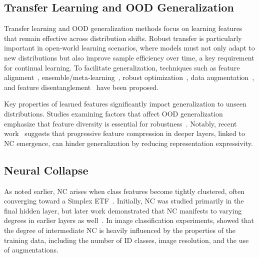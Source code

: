 \subsection{Transfer Learning and OOD Generalization}
\vspace{-0.5em}

Transfer learning and OOD generalization methods focus on learning features that remain effective across distribution shifts. Robust transfer is particularly important in open-world learning scenarios, where models must not only adapt to new distributions but also improve sample efficiency over time, a key requirement for continual learning. To facilitate generalization, techniques such as feature alignment~\cite{li2018domain, ahuja2021invariance, zhao2020domain, ming2024hypo}, ensemble/meta-learning~\cite{balaji2018metareg, li2018metalearning, li2019episodic, bui2021exploiting}, robust optimization~\cite{rame2022fishr, cha2021swad, krueger2021out, shi2021gradient}, data augmentation~\cite{nam2021reducing, nuriel2021permuted, zhou2020learning}, and feature disentanglement~\cite{zhang2022towards} have been proposed.

Key properties of learned features significantly impact generalization to unseen distributions. Studies examining factors that affect OOD generalization emphasize that feature diversity is essential for robustness~\cite{masarczyk2023tunnel, kornblith2021better, fang2024does, ramanujan2024connection, kolesnikov2020big, vishniakov2024convnet}. Notably, recent work~\cite{kothapalli2023neural, masarczyk2023tunnel, harun2024what} suggests that progressive feature compression in deeper layers, linked to NC emergence, can hinder generalization by reducing representation expressivity. %

\subsection{Neural Collapse}
\label{sec:nc_background}
\vspace{-0.5em}

As noted earlier, NC arises when class features become tightly clustered, often converging toward a Simplex ETF~\cite{papyan2020prevalence, kothapalli2023neural, zhu2021geometric, han2022neural}. Initially, NC was studied primarily in the final hidden layer, but later work demonstrated that NC manifests to varying degrees in earlier layers as well~\cite{rangamani2023feature, harun2024what}. In image classification experiments, \citet{harun2024what} showed that the degree of intermediate NC is heavily influenced by the properties of the training data, including the number of ID classes, image resolution, and the use of augmentations.

